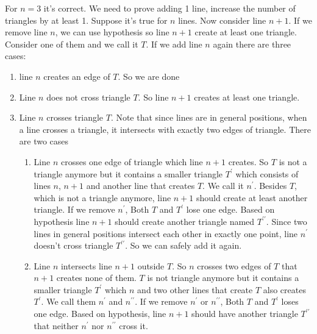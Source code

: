 \documentclass{book}
\begin{document}
	For $n = 3$ it's correct. We need to prove adding 1 line, increase the number of triangles by at least 1. Suppose it's true for $n$ lines. Now consider line $n + 1$. If we remove line $n$, we can use hypothesis so line $n + 1$ create at least one triangle. Consider one of them and we call it $T$. If we add line $n$ again there are three cases:
	\begin{enumerate}
		\item line $n$ creates an edge of $T$. So we are done
		\item Line $n$ does not cross triangle $T$. So line $n + 1$ creates at least  one triangle.
		\item Line $n$ crosses triangle $T$. Note that since lines are in general positions, when a line crosses a triangle, it intersects with exactly two edges of triangle. There are two cases
		\begin{enumerate}
			\item Line $n$ crosses one edge of triangle which line $n + 1$ creates. So $T$ is not a triangle anymore but it contains a smaller triangle $T^\prime$ which consists of lines $n$, $n + 1$ and another line that creates $T$. We call it $n^\prime$. Besides $T$, which is not a triangle anymore, line $n +1$ should create at least another triangle. If we remove $n^\prime$, Both $T$ and $T^\prime$ lose one edge. Based on hypothesis line $n + 1$ should create another triangle named $T^{\prime\prime}$. Since two lines in general positions intersect each other in exactly one point, line $n^\prime$ doesn't cross triangle $T^{\prime\prime}$. So we can safely add it again.
			\item Line $n$ intersects line $n + 1$ outside $T$. So $n$ crosses two edges of $T$ that $n + 1$ creates none of them. $T$ is not triangle anymore but it contains a smaller triangle $T^\prime$ which $n$ and two other lines that create $T$ also creates $T^\prime$. We call them $n^\prime$ and $n^{\prime\prime}$. If we remove $n^\prime$ or $n^{\prime\prime}$, Both $T$ and $T^\prime$ loses one edge. Based on hypothesis, line $n + 1$ should have another triangle $T^{\prime\prime}$ that neither $n^\prime$ nor $n^{\prime\prime}$ cross it.
		\end{enumerate}
	\end{enumerate}
	
\end{document}
